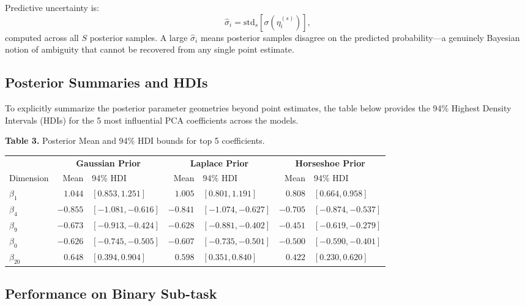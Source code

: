 \documentclass[10pt, letterpaper]{article}
\begin{document}
Predictive uncertainty is:
\[
\hat{\sigma}_i = \text{std}_s\left[ \sigma(\eta_i^{(s)}) \right],
\]
computed across all $S$ posterior samples. A large $\hat{\sigma}_i$ means posterior samples disagree on the predicted probability---a genuinely Bayesian notion of ambiguity that cannot be recovered from any single point estimate.

\subsection{Posterior Summaries and HDIs}

To explicitly summarize the posterior parameter geometries beyond point estimates, the table below provides the 94\% Highest Density Intervals (HDIs) for the 5 most influential PCA coefficients across the models.

\begin{center}\small
\textbf{Table 3.} Posterior Mean and 94\% HDI bounds for top 5 coefficients.\\[4pt]
\renewcommand{\arraystretch}{1.2}
\begin{tabular}{@{}lrlrlrl@{}}
\toprule
 & \multicolumn{2}{c}{\textbf{Gaussian Prior}} & \multicolumn{2}{c}{\textbf{Laplace Prior}} & \multicolumn{2}{c}{\textbf{Horseshoe Prior}} \\
\cmidrule(r){2-3} \cmidrule(lr){4-5} \cmidrule(l){6-7}
Dimension & Mean & 94\% HDI & Mean & 94\% HDI & Mean & 94\% HDI \\
\midrule
$\beta_{1}$  & $1.044$ & $[0.853, 1.251]$ & $1.005$ & $[0.801, 1.191]$ & $0.808$ & $[0.664, 0.958]$ \\
$\beta_{4}$  & $-0.855$ & $[-1.081, -0.616]$ & $-0.841$ & $[-1.074, -0.627]$ & $-0.705$ & $[-0.874, -0.537]$ \\
$\beta_{9}$  & $-0.673$ & $[-0.913, -0.424]$ & $-0.628$ & $[-0.881, -0.402]$ & $-0.451$ & $[-0.619, -0.279]$ \\
$\beta_{0}$  & $-0.626$ & $[-0.745, -0.505]$ & $-0.607$ & $[-0.735, -0.501]$ & $-0.500$ & $[-0.590, -0.401]$ \\
$\beta_{20}$ & $0.648$ & $[0.394, 0.904]$ & $0.598$ & $[0.351, 0.840]$ & $0.422$ & $[0.230, 0.620]$ \\
\bottomrule
\end{tabular}
\end{center}

\subsection{Performance on Binary Sub-task}
\end{document}
